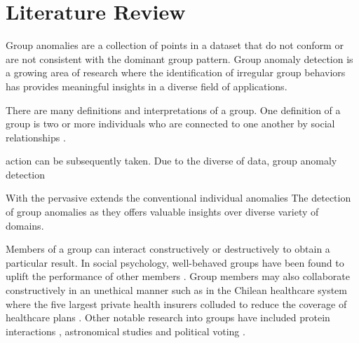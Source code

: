 \section{Literature Review}







Group anomalies are a collection of points in a dataset that do not conform or are not consistent with the dominant group pattern. Group anomaly detection is a growing area of research where the identification of irregular  group behaviors has provides meaningful insights in a diverse field of applications.


There are many definitions and interpretations of a group. One definition of a group is 
two or more individuals who are connected
to one another by social relationships \cite{Forsyth}. 




 action can be subsequently taken. Due to the diverse of data, group anomaly detection 


With the pervasive
 extends the conventional individual anomalies
The detection of group anomalies as they offers valuable insights over diverse variety of domains.



 Members of a group can interact constructively or destructively to obtain a particular result. In social psychology, well-behaved groups have been found to uplift the performance of other members  \cite{SocialG}. Group members may also collaborate constructively in an unethical manner such as in the Chilean healthcare system  where the five largest private health insurers colluded to reduce the coverage of healthcare plans \cite{Chile}. Other notable research into groups have included protein interactions \cite{MMSB}, astronomical studies \cite{MGMM} and political voting \cite{GLAD}.



